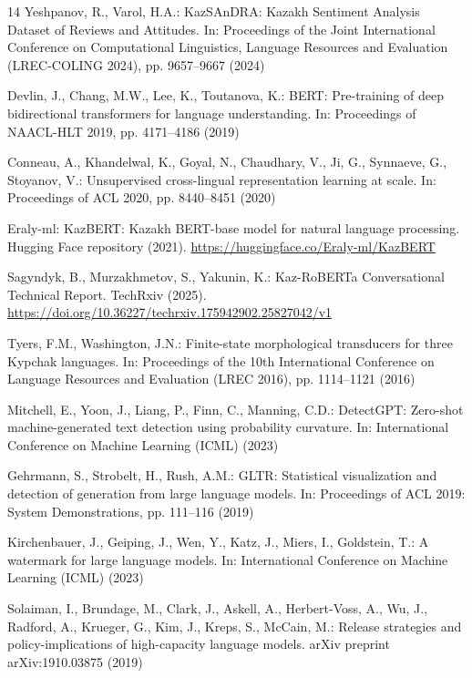 \documentclass[runningheads]{llncs}
\begin{document}
\begin{thebibliography}{14}
Yeshpanov, R., Varol, H.A.: KazSAnDRA: Kazakh Sentiment Analysis Dataset of Reviews and Attitudes. In: Proceedings of the Joint International Conference on Computational Linguistics, Language Resources and Evaluation (LREC-COLING 2024), pp. 9657--9667 (2024)

Devlin, J., Chang, M.W., Lee, K., Toutanova, K.: BERT: Pre-training of deep bidirectional transformers for language understanding. In: Proceedings of NAACL-HLT 2019, pp. 4171--4186 (2019)

Conneau, A., Khandelwal, K., Goyal, N., Chaudhary, V., Ji, G., Synnaeve, G., Stoyanov, V.: Unsupervised cross-lingual representation learning at scale. In: Proceedings of ACL 2020, pp. 8440--8451 (2020)

Eraly-ml: KazBERT: Kazakh BERT-base model for natural language processing. Hugging Face repository (2021). \url{https://huggingface.co/Eraly-ml/KazBERT}

Sagyndyk, B., Murzakhmetov, S., Yakunin, K.: Kaz-RoBERTa Conversational Technical Report. TechRxiv (2025). \url{https://doi.org/10.36227/techrxiv.175942902.25827042/v1}

Tyers, F.M., Washington, J.N.: Finite-state morphological transducers for three Kypchak languages. In: Proceedings of the 10th International Conference on Language Resources and Evaluation (LREC 2016), pp. 1114--1121 (2016)

Mitchell, E., Yoon, J., Liang, P., Finn, C., Manning, C.D.: DetectGPT: Zero-shot machine-generated text detection using probability curvature. In: International Conference on Machine Learning (ICML) (2023)

Gehrmann, S., Strobelt, H., Rush, A.M.: GLTR: Statistical visualization and detection of generation from large language models. In: Proceedings of ACL 2019: System Demonstrations, pp. 111--116 (2019)

Kirchenbauer, J., Geiping, J., Wen, Y., Katz, J., Miers, I., Goldstein, T.: A watermark for large language models. In: International Conference on Machine Learning (ICML) (2023)

Solaiman, I., Brundage, M., Clark, J., Askell, A., Herbert-Voss, A., Wu, J., Radford, A., Krueger, G., Kim, J., Kreps, S., McCain, M.: Release strategies and policy-implications of high-capacity language models. arXiv preprint arXiv:1910.03875 (2019)


\end{thebibliography}
\end{document}
